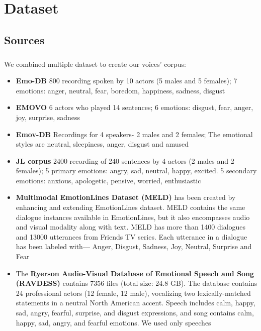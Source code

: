 \chapter{Dataset}

\section{Sources}

\paragraph{}
We combined multiple dataset to create our voices' corpus:

\begin{itemize}
	\item 
	\textbf{Emo-DB} \cite{krautdb} 800 recording spoken by 10 actors (5 males and 5 females); 7 emotions: anger, neutral, fear, boredom, happiness, sadness, disgust
	
	\item
	\textbf{EMOVO} \cite{costantini-etal-2014-emovo} 6 actors who played 14 sentences; 6 emotions: disgust, fear, anger, joy, surprise, sadness
	
	\item 
	\textbf{Emov-DB} \cite{adigwe2018emotional} Recordings for 4 speakers- 2 males and 2 females; The emotional styles are neutral, sleepiness, anger, disgust and amused
	
	\item 
	\textbf{JL corpus} \cite{jl-corpus} 2400 recording of 240 sentences by 4 actors (2 males and 2 females); 5 primary emotions: angry, sad, neutral, happy, excited. 5 secondary emotions: anxious, apologetic, pensive, worried, enthusiastic
	
	\item 
	\textbf{Multimodal EmotionLines Dataset (MELD)} \cite{poria2019meld} has been created by enhancing and extending EmotionLines dataset. MELD contains the same dialogue instances available in EmotionLines, but it also encompasses audio and visual modality along with text. MELD has more than 1400 dialogues and 13000 utterances from Friends TV series. Each utterance in a dialogue has been labeled with— Anger, Disgust, Sadness, Joy, Neutral, Surprise and Fear
	
	\item
	The \textbf{Ryerson Audio-Visual Database of Emotional Speech and Song (RAVDESS)} \cite{livingstone_steven_r_2018_1188976} contains 7356 files (total size: 24.8 GB). The database contains 24 professional actors (12 female, 12 male), vocalizing two lexically-matched statements in a neutral North American accent. Speech includes calm, happy, sad, angry, fearful, surprise, and disgust expressions, and song contains calm, happy, sad, angry, and fearful emotions. We used only speeches
\end{itemize}

